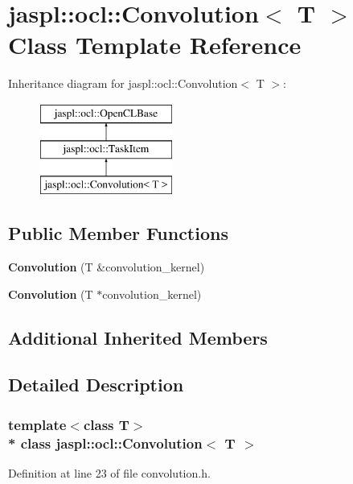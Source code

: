 \hypertarget{classjaspl_1_1ocl_1_1_convolution}{}\section{jaspl\+:\+:ocl\+:\+:Convolution$<$ T $>$ Class Template Reference}
\label{classjaspl_1_1ocl_1_1_convolution}
Inheritance diagram for jaspl\+:\+:ocl\+:\+:Convolution$<$ T $>$\+:\begin{figure}[H]
\begin{center}
\leavevmode
\includegraphics[height=3.000000cm]{classjaspl_1_1ocl_1_1_convolution}
\end{center}
\end{figure}
\subsection*{Public Member Functions}
\begin{DoxyCompactItemize}
\item 
{\bfseries Convolution} (T \&convolution\+\_\+kernel)\hypertarget{classjaspl_1_1ocl_1_1_convolution_a6629023123e1d668101ba76316ade16b}{}\label{classjaspl_1_1ocl_1_1_convolution_a6629023123e1d668101ba76316ade16b}

\item 
{\bfseries Convolution} (T $\ast$convolution\+\_\+kernel)\hypertarget{classjaspl_1_1ocl_1_1_convolution_a7e28dbb67e46efae9995d32a4c375290}{}\label{classjaspl_1_1ocl_1_1_convolution_a7e28dbb67e46efae9995d32a4c375290}

\end{DoxyCompactItemize}
\subsection*{Additional Inherited Members}


\subsection{Detailed Description}
\subsubsection*{template$<$class T$>$\\*
class jaspl\+::ocl\+::\+Convolution$<$ T $>$}



Definition at line 23 of file convolution.\+h.

